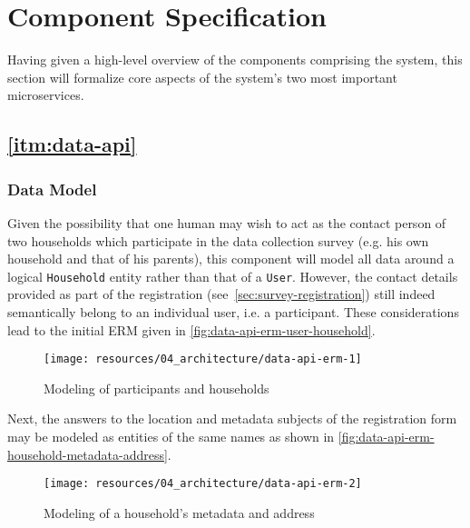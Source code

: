 \section{Component Specification}
\label{sec:component-specification}

Having given a high-level overview of the components comprising the system, this section will formalize core aspects of the system's two most important microservices.

\subsection{\ref{itm:data-api}}
\label{sec:component-specification-data-api}

\subsubsection{Data Model}
\label{sec:data-api-data-model}

Given the possibility that one human may wish to act as the contact person of two households which participate in the data collection survey (e.g. his own household and that of his parents), this component will model all data around a logical \texttt{Household} entity rather than that of a \texttt{User}. However, the contact details provided as part of the registration (see~\autoref{sec:survey-registration}) still indeed semantically belong to an individual user, i.e. a participant. These considerations lead to the initial \ac{ERM} given in \autoref{fig:data-api-erm-user-household}.

\begin{figure}[hbt]
  \centering
  \texttt{[image: resources/04\_architecture/data-api-erm-1]}
  \caption{Modeling of participants and households}
  \label{fig:data-api-erm-user-household}
\end{figure}

\FloatBarrier

Next, the answers to the location and metadata subjects of the registration form may be modeled as entities of the same names as shown in \autoref{fig:data-api-erm-household-metadata-address}.

\begin{figure}[hbt]
  \centering
  \texttt{[image: resources/04\_architecture/data-api-erm-2]}
  \caption{Modeling of a household's metadata and address}
  \label{fig:data-api-erm-household-metadata-address}
\end{figure}


